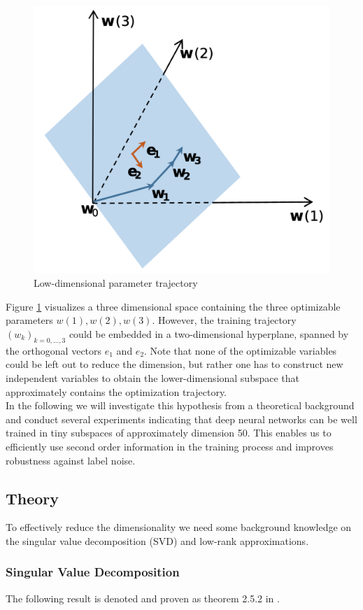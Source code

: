 \documentclass[11pt, a4paper]{article}
\begin{document}
\begin{figure}[!h]
\centering
\includegraphics[width=0.45\linewidth]{images/trajectory.png}
\caption{Low-dimensional parameter trajectory}
\label{fig:trajectory}
\end{figure}  

Figure \ref{fig:trajectory} visualizes a three dimensional space containing the three optimizable parameters $w(1), w(2), w(3)$. However, the training trajectory $(w_k)_{k=0, \dots, 3}$ could be embedded in a two-dimensional hyperplane, spanned by the orthogonal vectors $e_1$ and $e_2$. Note that none of the optimizable variables could be left out to reduce the dimension, but rather one has to construct new independent variables to obtain the lower-dimensional subspace that approximately contains the optimization trajectory. \\

In the following we will investigate this hypothesis from a theoretical background and conduct several experiments indicating that deep neural networks can be well trained in tiny subspaces of approximately dimension 50. This enables us to efficiently use second order information in the training process and improves robustness against label noise. 

\subsection{Theory}

To effectively reduce the dimensionality we need some background knowledge on the singular value decomposition (SVD) and low-rank approximations.

\subsubsection{Singular Value Decomposition}

The following result is denoted and proven as theorem 2.5.2 in \cite{SVD}.
\end{document}
